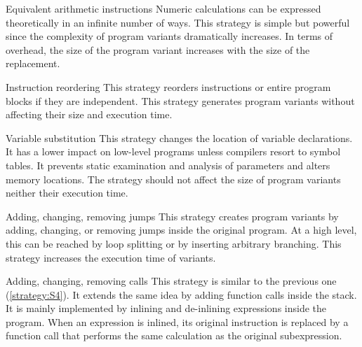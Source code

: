 \begin{strategy}{Equivalent arithmetic instructions}
    \label{strategy:S1}
    \normalfont
    Numeric calculations can be expressed theoretically in an infinite number of ways. This strategy is simple but powerful since the complexity of program variants dramatically increases. In terms of overhead, the size of the program variant increases with the size of the replacement. 
    
\end{strategy}


\begin{strategy}{Instruction reordering}
    \label{strategy:S2}
    \normalfont
    This strategy reorders instructions or entire program blocks if they are independent. This strategy generates program variants without affecting their size and execution time. 

\end{strategy}

\begin{strategy}{Variable substitution}
    \label{strategy:S3}
    \normalfont
    This strategy changes the location of variable declarations. It has a lower impact on low-level programs unless compilers resort to symbol tables. It prevents static examination and analysis of parameters and alters memory locations. The strategy should not affect the size of program variants neither their execution time.
\end{strategy}


\begin{strategy}{Adding, changing, removing jumps}
    \label{strategy:S4}
    \normalfont
    This strategy creates program variants by adding, changing, or removing jumps inside the original program. At a high level, this can be reached by loop splitting or by inserting arbitrary branching. This strategy increases the execution time of variants.
\end{strategy}


\begin{strategy}{Adding, changing, removing calls}
    \label{strategy:S5}
    \normalfont
    This strategy is similar to the previous one (\autoref{strategy:S4}). It extends the same idea by adding function calls inside the stack. It is mainly implemented by inlining and de-inlining expressions inside the program. When an expression is inlined, its original instruction is replaced by a function call that performs the same calculation as the original subexpression.
\end{strategy}


